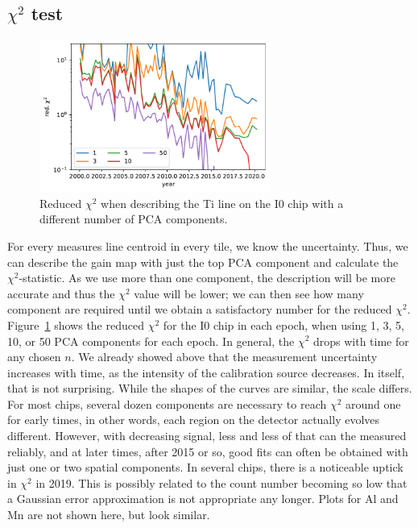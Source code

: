 \documentclass[]{spie}  %
\begin{document}
\subsection{$\chi^2$ test}
\begin{figure} [ht]
  \begin{center}
    \includegraphics[height=5cm]{figures/chi2.pdf}
  \end{center}
  \caption
      {Reduced $\chi^2$ when describing the Ti line on the I0 chip with a different number of PCA components.
        \label{fig:chi2}}
\end{figure}
For every measures line centroid in every tile, we know the uncertainty. Thus, we can describe the gain map with just the top PCA component and calculate the $\chi^2$-statistic. As we use more than one component, the description will be more accurate and thus the $\chi^2$ value will be lower; we can then see how many component are required until we obtain a satisfactory number for the reduced  $\chi^2$.
Figure~\ref{fig:chi2} shows the reduced $\chi^2$ for the I0 chip in each epoch, when using 1, 3, 5, 10, or 50 PCA components for each epoch. In general, the $\chi^2$ drops with time for any chosen $n$. We already showed above that the measurement uncertainty increases with time, as the intensity of the calibration source decreases. In itself, that is not surprising. While the shapes of the curves are similar, the scale differs. For most chips, several dozen components are necessary to reach  $\chi^2$ around one for early times, in other words, each region on the detector actually evolves different. However, with decreasing signal, less and less of that can the measured reliably, and at later times, after 2015 or so, good fits can often be obtained with just one or two spatial components. In several chips, there is a noticeable uptick in $\chi^2$ in 2019. This is possibly related to the count number becoming so low that a Gaussian error approximation is not appropriate any longer. Plots for Al and Mn are not shown here, but look similar.
\end{document}
